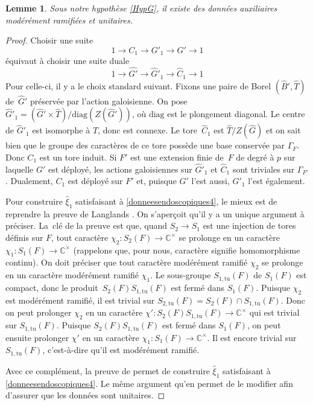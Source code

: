 \documentclass[JEP,XML,SOM,Unicode,francais]{cedram}
\newcommand{\diag}{\mathrm{diag}}
\newcommand{\tu}{\mathrm{tu}}
\newcommand{\CC}{\mathbb{C}}
\theoremstyle{plain}
\newtheorem*{lem*}{Lemme}
\theoremstyle{definition}
\begin{document}
\begin{lem*}
Sous notre hypothèse \ref{HypG}, il existe des données auxiliaires modérément ramifiées et unitaires.
\end{lem*}

\begin{proof}
Choisir une suite
\[
1\to C_{1}\to G'_{1}\to G'\to 1
\]
équivaut à choisir une suite duale
\[
1\to \hat{G'}\to \hat{G}'_{1}\to \hat{C}_{1}\to 1
\]
Pour celle-ci, il y a le choix standard suivant. Fixons une paire de Borel $(\hat{B}',\hat{T})$ de~$\hat{G}'$ préservée par l'action galoisienne. On pose $\hat{G}'_{1}=(\hat{G}'\times \hat{T})/\diag(Z(\hat{G}'))$, où $\diag$ est le plongement diagonal. Le centre de $\hat{G}'_{1}$ est isomorphe à $\hat{T}$, donc est connexe. Le tore~$\hat{C}_{1}$ est $\hat{T}/Z(\hat{G})$ et on sait bien que le groupe des caractères de ce tore possède une base conservée par $\Gamma_{F}$. Donc $C_{1}$ est un tore induit. Si $F'$ est une extension finie de~$F$ de degré à $p$ sur laquelle $G'$ est déployé, les actions galoisiennes sur $\hat{G}'_{1}$ et $\hat{C}_{1}$ sont triviales sur $\Gamma_{F'}$. Dualement, $C_{1}$ est déployé sur $F'$ et, puisque $G'$ l'est aussi, $G'_{1}$ l'est également.

Pour construire $\hat{\xi}_{1}$ satisfaisant à \eqref{donneesendoscopiques4}, le mieux est de reprendre la preuve de Langlands \cite[Lem.\,4]{L}. On s'aperçoit qu'il y a un unique argument à préciser. La~clé de la preuve est que, quand $S_{2}\to S_{1}$ est une injection de tores définis sur $F$, tout caractère $\chi_{2}:S_{2}(F)\to \CC^{\times}$ se prolonge en un caractère $\chi_{1}:S_{1}(F)\to \CC^{\times}$ (rappelons que, pour nous, caractère signifie homomorphisme continu). On doit préciser que tout caractère modé\-rément ramifié $\chi_{2}$ se prolonge en un caractère modérément ramifié $\chi_{1}$. Le sous-groupe $S_{1,\tu}(F)$ de $S_{1}(F)$ est compact, donc le produit~$S_{2}(F)S_{1,\tu}(F)$ est fermé dans $S_{1}(F)$. Puisque $\chi_{2}$ est modérément ramifié, il est trivial sur $S_{2,\tu}(F)=S_{2}(F)\cap S_{1,\tu}(F)$. Donc on peut prolonger $\chi_{2}$ en un caractère $\chi':S_{2}(F)S_{1,\tu}(F)\to \CC^{\times}$ qui est trivial sur $S_{1,\tu}(F)$. Puisque $S_{2}(F)S_{1,\tu}(F)$ est fermé dans $S_{1}(F)$, on peut ensuite prolonger $\chi'$ en un caractère $\chi_{1}:S_{1}(F)\to \CC^{\times}$. Il est encore trivial sur $S_{1,\tu}(F)$, c'est-à-dire qu'il est modérément ramifié.

Avec ce complément, la preuve de \cite{L} permet de construire $\hat{\xi}_{1}$ satisfaisant à \eqref{donneesendoscopiques4}. Le même argument qu'en \cite[I.7.1(3)]{MW} permet de le modifier afin d'assurer que les données sont unitaires.
\end{proof}
\end{document}
